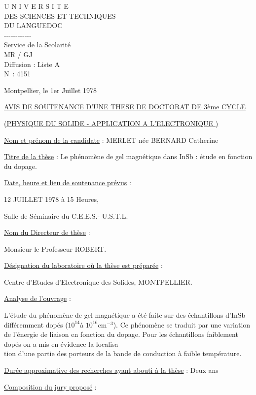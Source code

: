 \begin{center}
U N I V E R S I T E\\
DES SCIENCES ET TECHNIQUES\\
DU LANGUEDOC\\
-{}-{}-{}-{}-{}-{}-{}-{}-{}-{}-{}-\\
Service de la Scolarité\\
MR / GJ\\
Diffusion : Liste A\\
N\textdegree\ : 4151
\end{center}
Montpellier, le 1er Juillet 1978

\begin{center}
\uline{AVIS DE SOUTENANCE D'UNE THESE DE DOCTORAT DE 3ème CYCLE}

\uline{(PHYSIQUE DU SOLIDE - APPLICATION A L'ELECTRONIQUE )}
\end{center}

\uline{Nom et prénom de la candidate} : MERLET née BERNARD Catherine

\uline{Titre de la thèse} : Le phénomène de gel magnétique dans InSb : étude en fonction
du dopage.

\uline{Date, heure et lieu de soutenance prévus} :

12 JUILLET 1978 à 15 Heures,

Salle de Séminaire du C.E.E.S.- U.S.T.L.

\uline{Nom du Directeur de thèse} :

Monsieur le Professeur ROBERT.

\uline{Désignation du laboratoire où la thèse est préparée} :

Centre d'Etudes d'Electronique des Solides, MONTPELLIER.

\uline{Analyse de l'ouvrage} :

L'étude du phénomène de gel magnétique a été
faite sur des échantillons d'InSb différemment dopés (\(10^{14}\)à \(10^{16}\mathrm{cm}^{-3}\)). Ce
phénomène se traduit par une variation de l'énergie de liaison en fonction du
dopage. Pour les échantillons faiblement dopés on a mis en évidence la localisa-\\
tion d'une partie des porteurs de la bande de conduction à faible température.

\uline{Durée approximative des recherches ayant abouti à la thèse} : Deux ans

\uline{Composition du jury proposé} :


